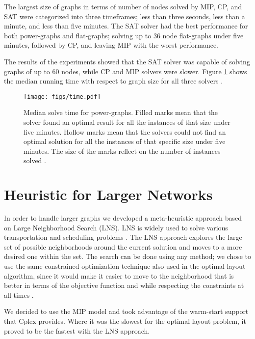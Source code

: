 \documentclass[a4paper,11pt,phdthesis,singlespace,twoside]{cssethesis}
\begin{document}
The largest size of graphs in terms of number of nodes solved by MIP, CP, and SAT were categorized into three timeframes; less than three seconds, less than a minute, and less than five minutes. The SAT solver had the best performance for both power-graphs and flat-graphs; solving up to 36 node flat-graphs under five minutes, followed by CP, and leaving MIP with the worst performance.

The results of the experiments showed that the SAT solver was capable of solving graphs of up to 60 nodes, while CP and MIP solvers were slower. Figure \ref{fig:time} shows the median running time with respect to graph size for all three solvers \cite{Yoghourdjian2015high}.

\begin{figure}[ht]
\begin{center}
\texttt{[image: figs/time.pdf]}
\end{center}
\caption{Median solve time for power-graphs. Filled marks mean that the solver found an optimal result for all the instances of that size under five minutes. Hollow marks mean that the solvers could not find an optimal solution for all the instances of that specific size under five minutes. The size of the marks reflect on the number of instances solved \cite{Yoghourdjian2015high}.}
\label{fig:time}
\end{figure}

\section{Heuristic for Larger Networks}
In order to handle larger graphs we developed a meta-heuristic approach based on Large Neighborhood Search (LNS). LNS is widely used to solve various transportation and scheduling problems \cite{LNS}. The LNS approach explores the large set of possible neighborhoods around the current solution and moves to a more desired one within the set. The search can be done using any method; we chose to use the same constrained optimization technique also used in the optimal layout algorithm, since it would make it easier to move to the neighborhood that is better in terms of the objective function and while respecting the constraints at all times \cite{Yoghourdjian2015high}.

We decided to use the MIP model and took advantage of the warm-start support that Cplex provides. Where it was the slowest for the optimal layout problem, it proved to be the fastest with the LNS approach.
\end{document}
